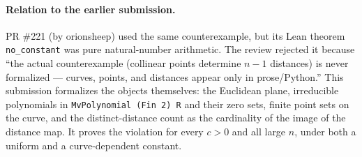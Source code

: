 \documentclass[11pt]{article}
\theoremstyle{definition}
\begin{document}
\paragraph{Relation to the earlier submission.} PR \#221 (by orionsheep) used the same
counterexample, but its Lean theorem \texttt{no\_constant} was pure natural-number arithmetic. The
review rejected it because ``the actual counterexample (collinear points determine $n-1$
distances) is never formalized --- curves, points, and distances appear only in prose/Python.''
This submission formalizes the objects themselves: the Euclidean plane, irreducible polynomials in
\texttt{MvPolynomial (Fin 2) R} and their zero sets, finite point sets on the curve, and the
distinct-distance count as the cardinality of the image of the distance map. It proves the
violation for every $c>0$ and all large $n$, under both a uniform and a curve-dependent constant.
\end{document}
